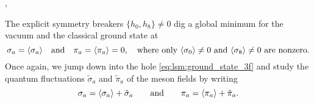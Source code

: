 ,


The explicit symmetry breakers $\{h_0,h_8\}\neq 0$ dig a global minimum for the vacuum and the classical ground state at
\begin{equation}
	\sigma_a = \langle \sigma_a \rangle \quad \text{and} \quad \pi_a = \langle \pi_a \rangle = 0, \quad \text{where only $\langle \sigma_0 \rangle \neq 0$ and $\langle \sigma_8 \rangle \neq 0$ are nonzero.}
\label{eq:lsm:ground_state_3f}
\end{equation}
Once again, we jump down into the hole \eqref{eq:lsm:ground_state_3f} and study the quantum fluctuations $\tilde{\sigma}_a$ and $\tilde{\pi}_a$ of the meson fields by writing
\begin{equation}
	\sigma_a = \langle \sigma_a \rangle + \tilde{\sigma}_a
	\qquad \text{and} \qquad
	\pi_a = \langle \pi_a \rangle + \tilde{\pi}_a.
\end{equation}

